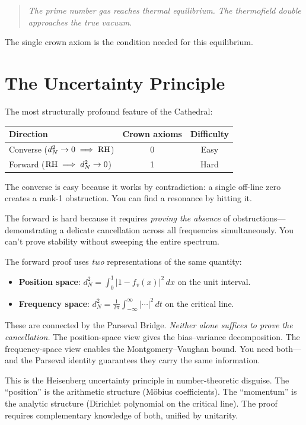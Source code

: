 \documentclass[11pt,a4paper]{article}
\begin{document}
\begin{quote}
\emph{The prime number gas reaches thermal equilibrium.
The thermofield double approaches the true vacuum.}
\end{quote}

The single crown axiom is the condition needed for this equilibrium.

\section{The Uncertainty Principle}
\label{sec:uncertainty}

The most structurally profound feature of the Cathedral:

\begin{center}
\begin{tabular}{@{}lcc@{}}
\toprule
\textbf{Direction} & \textbf{Crown axioms} & \textbf{Difficulty} \\
\midrule
Converse ($d_N^2 \to 0 \implies \mathrm{RH}$) & 0 & Easy \\
Forward ($\mathrm{RH} \implies d_N^2 \to 0$) & 1 & Hard \\
\bottomrule
\end{tabular}
\end{center}

The converse is easy because it works by contradiction: a single
off-line zero creates a rank-1 obstruction. You can find a resonance
by hitting it.

The forward is hard because it requires \emph{proving the absence}
of obstructions---demonstrating a delicate cancellation across all
frequencies simultaneously. You can't prove stability without
sweeping the entire spectrum.

\begin{principle}
The forward proof uses \emph{two} representations of the same
quantity:
\begin{itemize}
  \item \textbf{Position space}: $d_N^2 = \int_0^1 |1 - f_v(x)|^2\,dx$
    on the unit interval.
  \item \textbf{Frequency space}: $d_N^2 = \frac{1}{2\pi}
    \int_{-\infty}^{\infty} |\cdots|^2\,dt$ on the critical line.
\end{itemize}
These are connected by the Parseval Bridge. \emph{Neither alone
suffices to prove the cancellation.} The position-space view gives
the bias--variance decomposition. The frequency-space view enables
the Montgomery--Vaughan bound. You need both---and the Parseval
identity guarantees they carry the same information.

This is the Heisenberg uncertainty principle in number-theoretic
disguise. The ``position'' is the arithmetic structure (M\"obius
coefficients). The ``momentum'' is the analytic structure (Dirichlet
polynomial on the critical line). The proof requires complementary
knowledge of both, unified by unitarity.
\end{principle}
\end{document}
